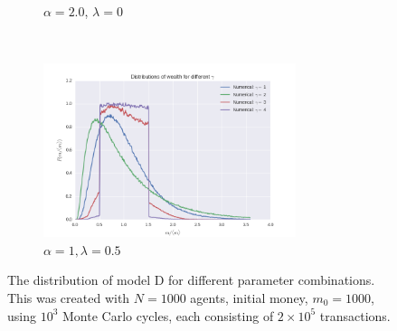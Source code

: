\documentclass[a4paper, 10pt]{article}
\begin{document}
\begin{figure}[!hb]
\begin{subfigure}[H!]{0.5\textwidth}
        \caption{$\alpha = 2.0$, $\lambda=0$}\label{fig:ModelD_dist_3}
    \end{subfigure}%
    ~
       \begin{subfigure}[H!]{0.5\textwidth}
        \centering
        \includegraphics[height=2.0in]{distGammasA1L05.png}
        \caption{$\alpha = 1, \lambda=0.5$}\label{fig:ModelD_dist_4}
    \end{subfigure}
\caption{The distribution of model D for different parameter combinations. This was created with $N=1000$ agents, initial money, $m_0=1000$, using $10^3$ Monte Carlo cycles, each consisting of $2\times 10^5$ transactions.}\label{fig:ModelD_dist}
\end{figure}
\end{document}
